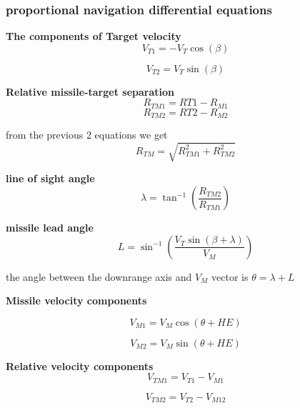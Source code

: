 \subsubsection*{proportional navigation differential equations}

\textbf{The components of Target velocity} 
\begin{equation}
V_{T1} = - V_T \cos(\beta)
\end{equation}

\begin{equation}
V_{T2} =  V_T \sin(\beta)
\end{equation}

\textbf{Relative missile-target separation}
\begin{equation}
R_{TM1} = R{T1} - R_{M1}
\end{equation}
\begin{equation}
R_{TM2} = R{T2} - R_{M2}
\end{equation}

from the previous 2 equations we get
\begin{equation}
R_{TM} = \sqrt{R_{TM1}^2 + R_{TM2}^2}
\label{RTM}
\end{equation}

\textbf{line of sight angle}
\begin{equation}
\lambda = \tan^{-1} (\dfrac{R_{TM2}}{R_{TM1}})
\label{lambda}
\end{equation}

\textbf{missile lead angle} 
\begin{equation}
L= \sin^{-1}(\dfrac{V_T \sin(\beta + \lambda)}{V_M})
\end{equation}

the angle between the downrange axis and $V_M$ vector is $\theta = \lambda + L$

\textbf{Missile velocity components} 

\begin{equation}
V_{M1} = V_M \cos (\theta + HE)
\end{equation}

\begin{equation}
V_{M2} = V_M \sin (\theta + HE)
\end{equation}

\textbf{Relative velocity components}
\begin{equation}
V_{TM1} = V_{T1} - V_{M1}
\end{equation}

\begin{equation}
V_{TM2} = V_{T2} - V_{M12}
\end{equation}


